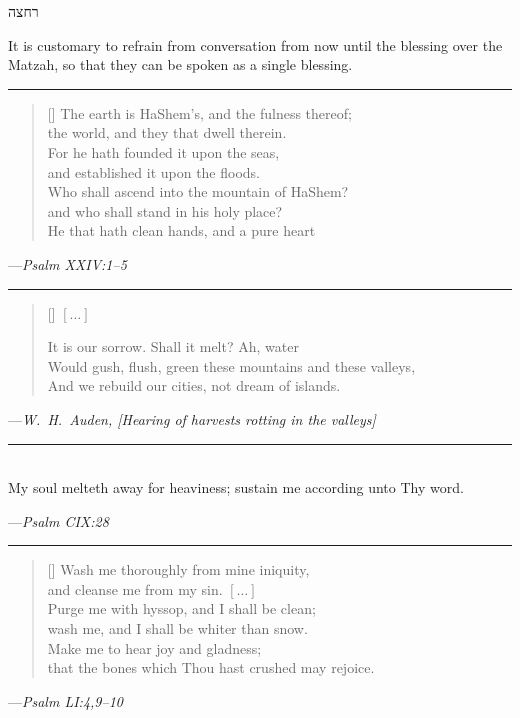 \documentclass[a4paper,10pt,openany]{memoir}
\newcommand{\HgEllipsis}{\ensuremath{\left[\ldots\right]}}
\newcommand{\HgSource}[1]{\hfill{\small---\itshape{#1}}}
\newcommand{\hchapter}[1]{
  \begin{hebrew}
    \begin{Spacing}{.97}
      \newpage
      \strut

      \vspace{.15em}

      \noindent\Huge #1

      \vspace{1em}
    \end{Spacing}
  \end{hebrew}
}
\newcommand{\HgFill}{\vfill \hrule \vfill}
\newenvironment{HgEnglish}{\strut\\\noindent}{\vspace{1em}}
\newcommand{\JSrc}{\textsuperscript{\upshape{[J]}}}
\newcommand{\SSrc}{\textsuperscript{\upshape{[S]}}}
\begin{document}
\vfill

\hchapter{רחצה}

It is customary to refrain from conversation from now until the blessing over
the Matzah, so that they can be spoken as a single blessing.

\HgFill

\settowidth{\versewidth}{\vin Who shall ascend into the mountain of HaShem?}
\begin{verse}[\versewidth]
  The earth is HaShem's, and the fulness thereof; \\
  \vin the world, and they that dwell therein. \\
  For he hath founded it upon the seas, \\
  \vin and established it upon the floods. \\
  Who shall ascend into the mountain of HaShem? \\
  \vin and who shall stand in his holy place? \\
  He that hath clean hands, and a pure heart \\
\end{verse}
\HgSource{Psalm XXIV:1--5 \JSrc}

\HgFill

\settowidth{\versewidth}{Would gush, flush, green these mountains and these
valleys}
\begin{verse}[\versewidth]
  \HgEllipsis

  It is our sorrow. Shall it melt? Ah, water \\
  Would gush, flush, green these mountains and these valleys, \\
  And we rebuild our cities, not dream of islands.
\end{verse}

\HgSource{W.~H.~Auden, [Hearing of harvests rotting in the valleys]}

\HgFill

\begin{HgEnglish}
  My soul melteth away for heaviness; sustain me according unto Thy word.

  \HgSource{Psalm CIX:28 \SSrc}
\end{HgEnglish}

\HgFill

\settowidth{\versewidth}{\vin that the bones which Thou hast crushed may
rejoice}
\begin{verse}[\versewidth]
  Wash me thoroughly from mine iniquity, \\
  \vin and cleanse me from my sin. \HgEllipsis \\
  Purge me with hyssop, and I shall be clean; \\
  \vin wash me, and I shall be whiter than snow. \\
  Make me to hear joy and gladness; \\
  \vin that the bones which Thou hast crushed may rejoice.
\end{verse}
\HgSource{Psalm LI:4,9--10 \SSrc}
\end{document}
